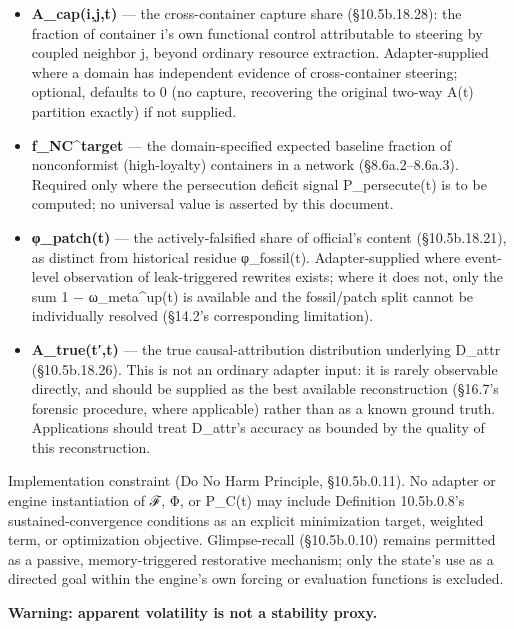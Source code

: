 \documentclass[
]{article}
\begin{document}
\begin{itemize}
  analysis); defaults to the trailing-slope proxy of Definition
  10.5b.18.12 if not supplied, which itself requires κ\_loyal and
  w\_loyal (below).
\item
  \textbf{A\_cap(i,j,t)} --- the cross-container capture share
  (§10.5b.18.28): the fraction of container i's own functional control
  attributable to steering by coupled neighbor j, beyond ordinary
  resource extraction. Adapter-supplied where a domain has independent
  evidence of cross-container steering; optional, defaults to 0 (no
  capture, recovering the original two-way A(t) partition exactly) if
  not supplied.
\item
  \textbf{f\_NC\^{}target} --- the domain-specified expected baseline
  fraction of nonconformist (high-loyalty) containers in a network
  (§8.6a.2--8.6a.3). Required only where the persecution deficit signal
  P\_persecute(t) is to be computed; no universal value is asserted by
  this document.
\item
  \textbf{φ\_patch(t)} --- the actively-falsified share of official's
  content (§10.5b.18.21), as distinct from historical residue
  φ\_fossil(t). Adapter-supplied where event-level observation of
  leak-triggered rewrites exists; where it does not, only the sum 1 −
  ω\_meta\^{}up(t) is available and the fossil/patch split cannot be
  individually resolved (§14.2's corresponding limitation).
\item
  \textbf{A\_true(t′,t)} --- the true causal-attribution distribution
  underlying D\_attr (§10.5b.18.26). This is not an ordinary adapter
  input: it is rarely observable directly, and should be supplied as the
  best available reconstruction (§16.7's forensic procedure, where
  applicable) rather than as a known ground truth. Applications should
  treat D\_attr's accuracy as bounded by the quality of this
  reconstruction.
\end{itemize}

Implementation constraint (Do No Harm Principle, §10.5b.0.11). No
adapter or engine instantiation of ℱ, Φ, or P\_C(t) may include
Definition 10.5b.0.8's sustained-convergence conditions as an explicit
minimization target, weighted term, or optimization objective.
Glimpse-recall (§10.5b.0.10) remains permitted as a passive,
memory-triggered restorative mechanism; only the state's use as a
directed goal within the engine's own forcing or evaluation functions is
excluded.

\textbf{Warning: apparent volatility is not a stability proxy.}
\end{document}
